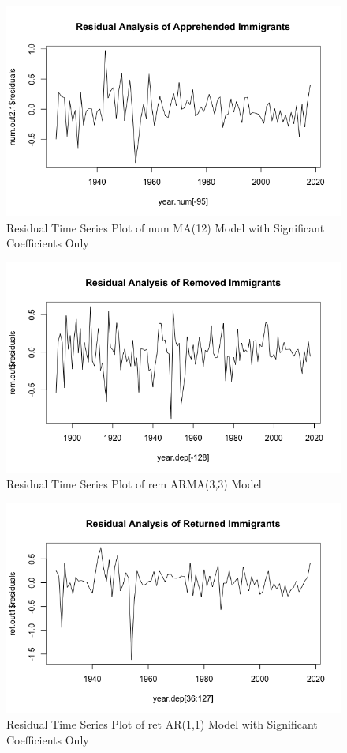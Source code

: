 \documentclass[a4paper]{article}
\begin{document}
\begin{figure}[h!]
\centering
\includegraphics[scale=0.4]{images/residual_num.png}
\caption{Residual Time Series Plot of num MA(12) Model with Significant Coefficients Only}
\label{fig:res_num}
\end{figure}

\begin{figure}[h!]
\centering
\includegraphics[scale=0.4]{images/residual_rem.png}
\caption{Residual Time Series Plot of rem ARMA(3,3) Model}
\label{fig:res_rem}
\end{figure}

\begin{figure}[h!]
\centering
\includegraphics[scale=0.4]{images/residual_ret.png}
\caption{Residual Time Series Plot of ret AR(1,1) Model with Significant Coefficients Only}
\label{fig:res_ret}
\end{figure}
\end{document}
